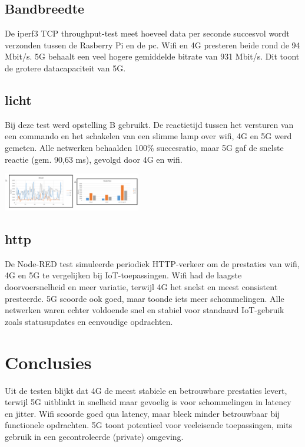 \documentclass[a0,portrait]{hogent-poster}
\begin{document}
\begin{multicols}{2}
\begin{multicols}{2}
\subsection*{Bandbreedte}
De iperf3 TCP throughput-test meet hoeveel data per seconde succesvol wordt verzonden tussen de Rasberry Pi en de pc. Wifi en 4G presteren beide rond de 94 Mbit/s. 5G behaalt een veel hogere gemiddelde bitrate van 931 Mbit/s. Dit toont de grotere datacapaciteit van 5G. 

\subsection*{licht}
Bij deze test werd opstelling B gebruikt. De reactietijd tussen het versturen van een commando en het schakelen van een slimme lamp over wifi, 4G en 5G werd gemeten. Alle netwerken behaalden 100\% succesratio, maar 5G gaf de snelste reactie (gem. 90,63 ms), gevolgd door 4G en wifi. 
\end{multicols}
\begin{center}
    \captionsetup{type=figure}
    \includegraphics[width=0.45\textwidth]{../graphics/http.png}
\end{center}
\subsection*{http}
De Node-RED test simuleerde periodiek HTTP-verkeer om de prestaties van wifi, 4G en 5G te vergelijken bij IoT-toepassingen. Wifi had de laagste doorvoersnelheid en meer variatie, terwijl 4G het snelst en meest consistent presteerde. 5G scoorde ook goed, maar toonde iets meer schommelingen. Alle netwerken waren echter voldoende snel en stabiel voor standaard IoT-gebruik zoals statusupdates en eenvoudige opdrachten.


\section{Conclusies}
Uit de testen blijkt dat 4G de meest stabiele en betrouwbare prestaties levert, terwijl 5G uitblinkt in snelheid maar gevoelig is voor schommelingen in latency en jitter. Wifi scoorde goed qua latency, maar bleek minder betrouwbaar bij functionele opdrachten. 5G toont potentieel voor veeleisende toepassingen, mits gebruik in een gecontroleerde (private) omgeving.


\end{multicols}
\end{document}
